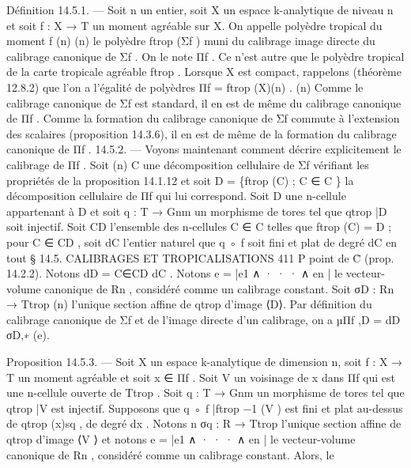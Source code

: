 \documentclass[
  10pt,
]{article}
\newenvironment{Shaded}{}{}
\newcommand{\NormalTok}[1]{#1}
\begin{document}
\begin{Shaded}
\begin{Highlighting}[]
\NormalTok{Définition 14.5.1. — Soit n un entier, soit X un espace k{-}analytique de niveau n et}
\NormalTok{soit f : X → T un moment agréable sur X. On appelle polyèdre tropical du moment f}
\NormalTok{                    (n)                                                            (n)}
\NormalTok{le polyèdre ftrop (Σf ) muni du calibrage image directe du calibrage canonique de Σf .}
\NormalTok{On le note Πf .}
\NormalTok{  Ce n’est autre que le polyèdre tropical de la carte tropicale agréable ftrop .}
\NormalTok{  Lorsque X est compact, rappelons (théorème 12.8.2) que l’on a l’égalité de polyèdres}
\NormalTok{Πf = ftrop (X)(n) .}
\NormalTok{                                       (n)}
\NormalTok{  Comme le calibrage canonique de Σf est standard, il en est de même du calibrage}
\NormalTok{canonique de Πf .}
\NormalTok{  Comme la formation du calibrage canonique de Σf commute à l’extension des scalaires}
\NormalTok{(proposition 14.3.6), il en est de même de la formation du calibrage canonique de Πf .}
\NormalTok{14.5.2. — Voyons maintenant comment décrire explicitement le calibrage de Πf . Soit}
\NormalTok{                                       (n)}
\NormalTok{C une décomposition cellulaire de Σf vérifiant les propriétés de la proposition 14.1.12}
\NormalTok{et soit D = \{ftrop (C) ; C ∈ C \} la décomposition cellulaire de Πf qui lui correspond.}
\NormalTok{Soit D une n{-}cellule appartenant à D et soit q : T → Gnm un morphisme de tores tel que}
\NormalTok{qtrop |D soit injectif. Soit CD l’ensemble des n{-}cellules C ∈ C telles que ftrop (C) = D ;}
\NormalTok{pour C ∈ CD , soit dC l’entier naturel que q ◦ f soit fini et plat de degré dC en tout}
\NormalTok{                           § 14.5. CALIBRAGES ET TROPICALISATIONS                              411}
\NormalTok{                                          P}
\NormalTok{point de C̊ (prop. 14.2.2). Notons dD = C∈CD dC . Notons e = |e1 ∧ · · · ∧ en | le vecteur{-}}
\NormalTok{volume canonique de Rn , considéré comme un calibrage constant. Soit σD : Rn → Ttrop}
\NormalTok{                                                                                        (n)}
\NormalTok{l’unique section affine de qtrop d’image ⟨D⟩. Par définition du calibrage canonique de Σf}
\NormalTok{et de l’image directe d’un calibrage, on a µΠf ,D = dD σD,∗ (e).}

\NormalTok{Proposition 14.5.3. — Soit X un espace k{-}analytique de dimension n, soit f : X → T}
\NormalTok{un moment agréable et soit x ∈ Πf . Soit V un voisinage de x dans Πf qui est une n{-}cellule}
\NormalTok{ouverte de Ttrop . Soit q : T → Gnm un morphisme de tores tel que qtrop |V est injectif.}
\NormalTok{Supposons que q ◦ f |ftrop}
\NormalTok{                       −1}
\NormalTok{                           (V ) est fini et plat au{-}dessus de qtrop (x)sq , de degré dx . Notons}
\NormalTok{        n}
\NormalTok{σq : R → Ttrop l’unique section affine de qtrop d’image ⟨V ⟩ et notons e = |e1 ∧ · · · ∧ en |}
\NormalTok{le vecteur{-}volume canonique de Rn , considéré comme un calibrage constant. Alors, le}
\end{Highlighting}
\end{Shaded}
\end{document}
